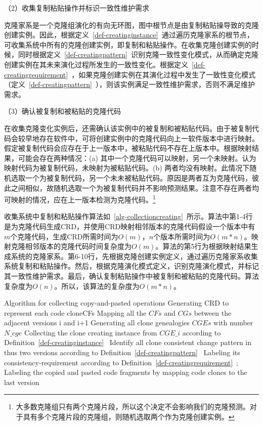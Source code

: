 （2）收集复制粘贴操作并标识一致性维护需求

克隆家系是一个克隆组演化的有向无环图，图中根节点是由复制粘贴操导致的克隆创建实例。因此，根据定义~\ref{def-creatinginstance}~通过遍历克隆家系的根节点，可收集系统中所有的克隆创建实例，即复制和粘贴操作。在收集克隆创建实例的时候，同时根据定义~\ref{def-creatingpattern}~识别克隆一致性变化模式，从而确定克隆创建实例在其未来演化过程所发生的一致性变化。根据定义~\ref{def-creatingrequirement}~，如果克隆创建实例在其演化过程中发生了一致性变化模式（定义~\ref{def-creatingpattern}~），则该实例满足一致性维护需求，否则不满足维护需求。

（3）确认被复制和被粘贴的克隆代码

在收集克隆变化实例后，还需确认该实例中的被复制和被粘贴代码。由于被复制代码会较早地存在软件中，可将创建实例中的克隆代码向上一软件版本中进行映射。假定被复制代码会应存在于上一版本中，被粘贴代码不存在上版本中。根据映射结果，可能会存在两种情况：(a) 其中一个克隆代码可以映射，另一个未映射。认为映射代码为被复制代码，未映射为被粘贴代码。(b) 两者均没有映射。此情况下随机选取一个为被复制代码，另一个未未被粘贴代码。原因是两者互为克隆代码，彼此之间相似，故随机选取一个为被复制代码并不影响预测结果。注意不存在两者均可映射的情况，应在上一版本检测为克隆代码。\footnote{大多数克隆组只有两个克隆片段，所以这个决定不会影响我们的克隆预测。对于具有多个克隆片段的克隆组，则随机选取两个作为克隆创建实例。}

收集系统中复制和粘贴操作算法如~\ref{alg-collectioncreating}~所示。算法中第1-4行是为克隆代码生成CRD，并使用CRD映射相邻版本的克隆代码假设一个版本中有$m$个克隆代码，生成CRD所需时间为$O(m)$，$n$个版本所需时间为$O(m*n)$。映射克隆相邻版本的克隆代码时间复杂度为$O(m)$。算法的第5行为根据映射结果生成系统的克隆家系。第6-10行，先根据克隆创建实例定义，通过遍历克隆家系收集系统复制和粘贴操作。然后，根据克隆演化模式定义，识别克隆演化模式，并标记其一致性维护需求。最后，确认复制粘贴操作中被复制和被粘贴的克隆代码。算法复杂度为$O(n)$。所以，该算法的复杂度为$O(m*n)$。

\begin{minipage}{0.8\textwidth}
\centering
\begin{algorithm}[H]
 {Algorithm for collecting copy-and-pasted operations}
\label{alg-collectioncreating}
{ 
 Generating CRD to represent each code clone{CFs}\;
 Mapping all the $CFs$ and $CGs$ between the adjacent versions {i} and {i+1}\;
}
Generating all clone genealogies $CGEs$ with number $N\_cge$\;
{ 
 Collecting the clone creating instance from $CGE\_i$ according to Definition~\ref{def-creatinginstance}~\; 
 Identify all clone consistent change pattern in thus two versions according to Definition~\ref{def-creatingpattern}~\;
 Labeling its consistency-requirement according to Definition~\ref{def-creatingrequirement}~; 
 Labeling the copied and pasted code fragments by mapping code clones to the last version\;
}
\end{algorithm}
\end{minipage}

